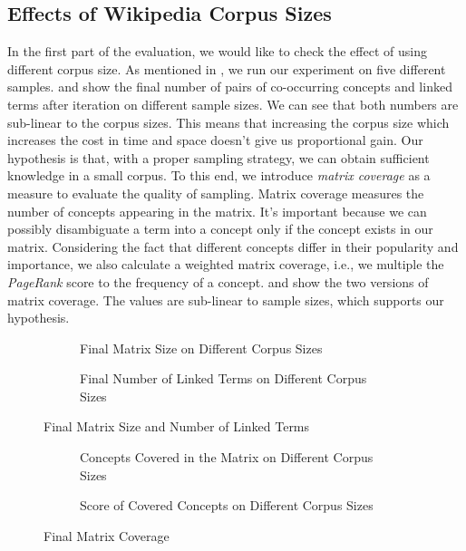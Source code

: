 \subsection{Effects of Wikipedia Corpus Sizes}
In the first part of the evaluation, we would like to check the effect of
using different corpus size. As mentioned in ,
we run our experiment on five different samples.
 and  show the final number of pairs of
co-occurring concepts and linked terms after iteration on different
sample sizes. We can see that both numbers are sub-linear to the corpus sizes.
This means that increasing the corpus size which increases the cost in
time and space doesn't give us proportional gain.
Our hypothesis is that, with a proper sampling strategy,
we can obtain sufficient knowledge in a small corpus.
To this end, we introduce {\em matrix coverage} as a measure to evaluate the
quality of sampling. Matrix coverage measures the number of concepts appearing in
the matrix. It's important because we can possibly disambiguate a term into a concept
only if the concept exists in our matrix. Considering the fact that
different concepts differ in their popularity and importance,
we also calculate a weighted matrix coverage, i.e.,
we multiple the \emph{PageRank} score to the frequency of a concept.
 and  show the two versions of
matrix coverage. The values are sub-linear to sample sizes,
which supports our hypothesis.

\begin{figure}[th]
\begin{subfigure}[t]{0.49\columnwidth}
\centering
{}
\caption{Final Matrix Size on Different Corpus Sizes}
\label{fig:m_final}
\end{subfigure}
\hfill
\begin{subfigure}[t]{0.49\columnwidth}
\centering
{}
\caption{Final Number of Linked Terms on Different Corpus Sizes}
\label{fig:l_final}
\end{subfigure}
\caption{Final Matrix Size and Number of Linked Terms}
\end{figure}

\begin{figure}[th]
\begin{subfigure}[t]{0.49\columnwidth}
\centering
{}
\caption{Concepts Covered in the Matrix on Different Corpus Sizes}
\label{fig:rows}
\end{subfigure}
\hfill
\begin{subfigure}[t]{0.49\columnwidth}
\centering
{}
\caption{Score of Covered Concepts on Different Corpus Sizes}
\label{fig:scores}
\end{subfigure}
\caption{Final Matrix Coverage}
\end{figure}

